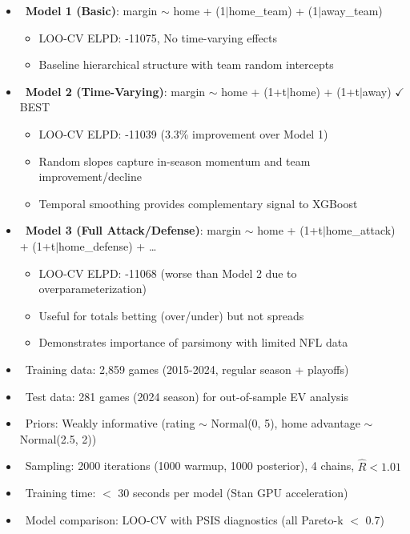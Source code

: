 \begin{itemize}
  \item \done\ \textbf{Model 1 (Basic)}: margin $\sim$ home + (1$|$home\_team) + (1$|$away\_team)
  \begin{itemize}
    \item LOO-CV ELPD: -11075, No time-varying effects
    \item Baseline hierarchical structure with team random intercepts
  \end{itemize}
  \item \done\ \textbf{Model 2 (Time-Varying)}: margin $\sim$ home + (1+t$|$home) + (1+t$|$away) \textcolor{green!60!black}{$\checkmark$ BEST}
  \begin{itemize}
    \item LOO-CV ELPD: -11039 (3.3\% improvement over Model 1)
    \item Random slopes capture in-season momentum and team improvement/decline
    \item Temporal smoothing provides complementary signal to XGBoost
  \end{itemize}
  \item \done\ \textbf{Model 3 (Full Attack/Defense)}: margin $\sim$ home + (1+t$|$home\_attack) + (1+t$|$home\_defense) + \dots
  \begin{itemize}
    \item LOO-CV ELPD: -11068 (worse than Model 2 due to overparameterization)
    \item Useful for totals betting (over/under) but not spreads
    \item Demonstrates importance of parsimony with limited NFL data
  \end{itemize}
\end{itemize}

\begin{itemize}
  \item \done\ Training data: 2,859 games (2015-2024, regular season + playoffs)
  \item \done\ Test data: 281 games (2024 season) for out-of-sample EV analysis
  \item \done\ Priors: Weakly informative (rating $\sim$ Normal(0, 5), home advantage $\sim$ Normal(2.5, 2))
  \item \done\ Sampling: 2000 iterations (1000 warmup, 1000 posterior), 4 chains, $\hat{R} < 1.01$
  \item \done\ Training time: $<$ 30 seconds per model (Stan GPU acceleration)
  \item \done\ Model comparison: LOO-CV with PSIS diagnostics (all Pareto-k $<$ 0.7)
\end{itemize}

